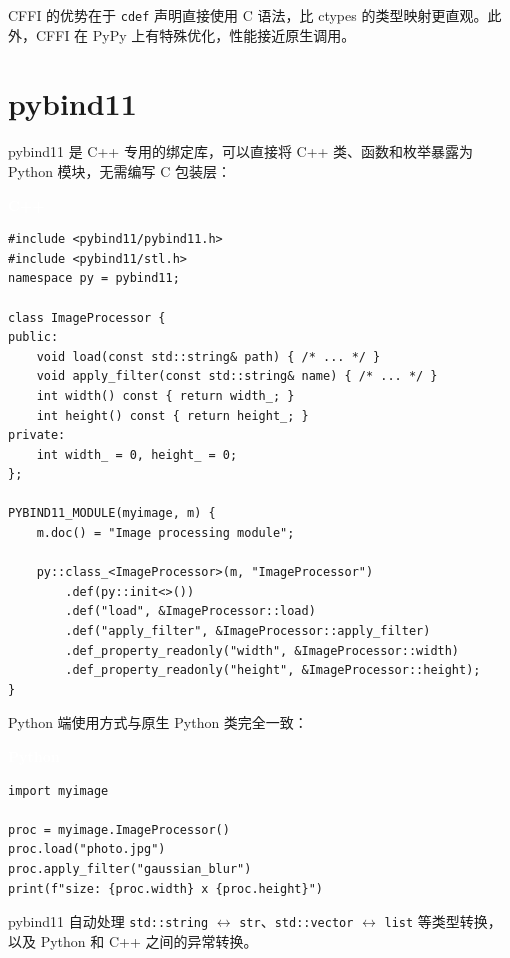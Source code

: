 \documentclass[12pt,a4paper,fontset=fandol]{ctexbook}
\newcommand{\cpplabel}{%
  \begin{tcolorbox}[enhanced,colback=cppheadbg,colframe=cppheadbg,
    arc=1mm,boxrule=0mm,left=6pt,right=6pt,top=2pt,bottom=2pt,
    halign=left,oversize]
    \textcolor{white}{\small\bfseries C++}
  \end{tcolorbox}\vspace{-4pt}}
\newcommand{\pythonlabel}{%
  \begin{tcolorbox}[enhanced,colback=pythonheadbg,colframe=pythonheadbg,
    arc=1mm,boxrule=0mm,left=6pt,right=6pt,top=2pt,bottom=2pt,
    halign=left,oversize]
    \textcolor{white}{\small\bfseries Python}
  \end{tcolorbox}\vspace{-4pt}}
\newcommand{\cpp}[1]{C++#1}
\newcommand{\Tp}[1]{\texttt{#1}}
\begin{document}
CFFI 的优势在于 \texttt{cdef} 声明直接使用 C 语法，比 ctypes 的类型映射更直观。此外，CFFI 在 PyPy 上有特殊优化，性能接近原生调用。

\section{pybind11}

pybind11 是 \cpp{} 专用的绑定库，可以直接将 \cpp{} 类、函数和枚举暴露为 Python 模块，无需编写 C 包装层：

\cpplabel
\begin{lstlisting}[style=cppstyle]
#include <pybind11/pybind11.h>
#include <pybind11/stl.h>
namespace py = pybind11;

class ImageProcessor {
public:
    void load(const std::string& path) { /* ... */ }
    void apply_filter(const std::string& name) { /* ... */ }
    int width() const { return width_; }
    int height() const { return height_; }
private:
    int width_ = 0, height_ = 0;
};

PYBIND11_MODULE(myimage, m) {
    m.doc() = "Image processing module";

    py::class_<ImageProcessor>(m, "ImageProcessor")
        .def(py::init<>())
        .def("load", &ImageProcessor::load)
        .def("apply_filter", &ImageProcessor::apply_filter)
        .def_property_readonly("width", &ImageProcessor::width)
        .def_property_readonly("height", &ImageProcessor::height);
}
\end{lstlisting}

Python 端使用方式与原生 Python 类完全一致：

\pythonlabel
\begin{lstlisting}[style=pythonstyle]
import myimage

proc = myimage.ImageProcessor()
proc.load("photo.jpg")
proc.apply_filter("gaussian_blur")
print(f"size: {proc.width} x {proc.height}")
\end{lstlisting}

pybind11 自动处理 \texttt{std::string} $\leftrightarrow$ \Tp{str}、\texttt{std::vector} $\leftrightarrow$ \Tp{list} 等类型转换，以及 Python 和 \cpp{} 之间的异常转换。
\end{document}
